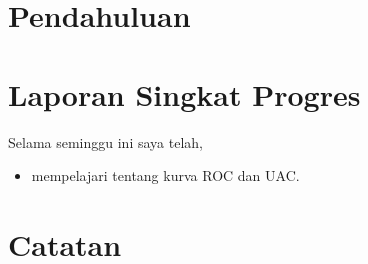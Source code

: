 






\section{Pendahuluan}




\section{Laporan Singkat Progres}

Selama seminggu ini saya telah,
\begin{itemize}
\item mempelajari tentang kurva ROC dan UAC.
\end{itemize}

\section{Catatan}



\clearpage
{}

\advisorsignature

\clearpage
{}
\printbibliography

\newpage
\appendix


